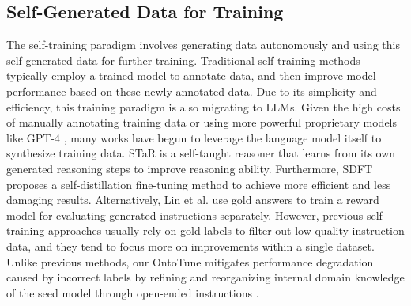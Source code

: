 \subsection{Self-Generated Data for Training}
The self-training paradigm involves generating data autonomously and using this self-generated data for further training. Traditional self-training methods \cite{DBLP:conf/iclr/HeGSR20,DBLP:conf/cvpr/XieLHL20,DBLP:journals/corr/abs-2202-12040,DBLP:conf/emnlp/0001GHW00023} typically employ a trained model to annotate data, and then improve model performance based on these newly annotated data. Due to its simplicity and efficiency, this training paradigm is also migrating to LLMs. Given the high costs of manually annotating training data or using more powerful proprietary models like GPT-4 \cite{DBLP:journals/corr/abs-2303-08774}, many works \cite{DBLP:conf/icml/MengMHZA023,DBLP:conf/acl/YangPFWCZL24,DBLP:conf/acl/WangKMLSKH23,DBLP:journals/corr/abs-2402-06457,DBLP:journals/tmlr/SinghCAAPGLH0XP24} have begun to leverage the language model itself to synthesize training data. STaR \cite{DBLP:conf/nips/ZelikmanWMG22} is a self-taught reasoner that learns from its own generated reasoning steps to improve reasoning ability. Furthermore, SDFT \cite{DBLP:conf/acl/YangPFWCZL24} proposes a self-distillation fine-tuning method to achieve more efficient and less damaging results. Alternatively, Lin et al. \cite{DBLP:journals/corr/abs-2404-07965} use gold answers to train a reward model for evaluating generated instructions separately. However, previous self-training approaches usually rely on gold labels to filter out low-quality instruction data, and they tend to focus more on improvements within a single dataset. Unlike previous methods, our OntoTune mitigates performance degradation caused by incorrect labels by refining and reorganizing internal domain knowledge of the seed model through open-ended instructions \cite{DBLP:conf/iclr/0009CMZYSZ24,DBLP:conf/acl/TyenMCCM24}.